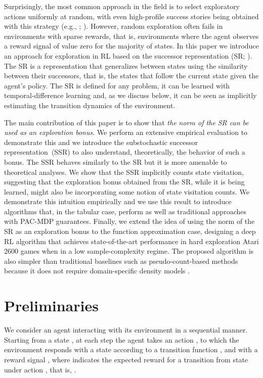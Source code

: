 \documentclass[letterpaper]{article} \usepackage{aaai20}  \usepackage{times}  \usepackage{helvet} \usepackage{courier}  \usepackage[hyphens]{url}  \usepackage{graphicx} \urlstyle{rm} \def\UrlFont{\rm}  \usepackage{graphicx}  \frenchspacing  \setlength{\pdfpagewidth}{8.5in}  \setlength{\pdfpageheight}{11in}  \usepackage{booktabs}
\begin{document}
Surprisingly, the most common approach in the field is to select exploratory actions uniformly at random, with even high-profile success stories being obtained with this strategy (e.g., \citeauthor{Tesauro95} \citeyear{Tesauro95}; \citeauthor{Mnih15} \citeyear{Mnih15}). However, random exploration often fails in environments with sparse rewards, that is, environments where the agent observes a reward signal of value zero for the majority of states. In this paper we introduce an approach for exploration in RL based on the successor representation (SR; \citeauthor{Dayan93} \citeyear{Dayan93}). The SR is a representation that generalizes between states using the similarity between their successors, that is, the states that follow the current state given the agent's policy. The SR is defined for any problem, it can be learned with temporal-difference learning and, as we discuss below, it can be seen as implicitly estimating the transition dynamics of the environment.

The main contribution of this paper is to show that \emph{the norm of the SR can be used as an exploration bonus}. We perform an extensive empirical evaluation to demonstrate this and we introduce the substochastic successor representation~(SSR) to also understand, theoretically, the behavior of such a bonus. The SSR behaves similarly to the SR but it is more amenable to theoretical analyses. We show that the SSR implicitly counts state visitation, suggesting that the exploration bonus obtained from the SR, while it is being learned, might also be incorporating some notion of state visitation counts. We demonstrate this intuition empirically and we use this result to introduce algorithms that, in the tabular case, perform as well as traditional approaches with PAC-MDP guarantees. Finally, we extend the idea of using the norm of the SR as an exploration bonus to the function approximation case, designing a deep RL algorithm that achieves state-of-the-art performance in hard exploration Atari 2600 games when in a low sample-complexity regime. The proposed algorithm is also simpler than traditional baselines such as pseudo-count-based methods because it does not require domain-specific density models \cite{Bellemare16,Ostrovski17}.

\section{Preliminaries}
\label{sec:background}

We consider an agent interacting with its environment in a sequential manner. Starting from a state , at each step the agent takes an action , to which the environment responds with a state  according to a transition function , and with a reward signal , where  indicates the expected reward for a transition from state  under action , that is, .
\end{document}

